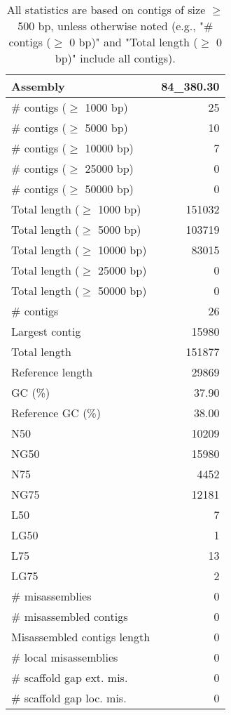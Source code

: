\documentclass[12pt,a4paper]{article}
\begin{document}
\begin{table}[ht]
\begin{center}
\caption{All statistics are based on contigs of size $\geq$ 500 bp, unless otherwise noted (e.g., "\# contigs ($\geq$ 0 bp)" and "Total length ($\geq$ 0 bp)" include all contigs).}
\begin{tabular}{|l*{1}{|r}|}
\hline
Assembly & 84\_380.30 \\ \hline
\# contigs ($\geq$ 1000 bp) & 25 \\ \hline
\# contigs ($\geq$ 5000 bp) & 10 \\ \hline
\# contigs ($\geq$ 10000 bp) & 7 \\ \hline
\# contigs ($\geq$ 25000 bp) & 0 \\ \hline
\# contigs ($\geq$ 50000 bp) & 0 \\ \hline
Total length ($\geq$ 1000 bp) & 151032 \\ \hline
Total length ($\geq$ 5000 bp) & 103719 \\ \hline
Total length ($\geq$ 10000 bp) & 83015 \\ \hline
Total length ($\geq$ 25000 bp) & 0 \\ \hline
Total length ($\geq$ 50000 bp) & 0 \\ \hline
\# contigs & 26 \\ \hline
Largest contig & 15980 \\ \hline
Total length & 151877 \\ \hline
Reference length & 29869 \\ \hline
GC (\%) & 37.90 \\ \hline
Reference GC (\%) & 38.00 \\ \hline
N50 & 10209 \\ \hline
NG50 & 15980 \\ \hline
N75 & 4452 \\ \hline
NG75 & 12181 \\ \hline
L50 & 7 \\ \hline
LG50 & 1 \\ \hline
L75 & 13 \\ \hline
LG75 & 2 \\ \hline
\# misassemblies & 0 \\ \hline
\# misassembled contigs & 0 \\ \hline
Misassembled contigs length & 0 \\ \hline
\# local misassemblies & 0 \\ \hline
\# scaffold gap ext. mis. & 0 \\ \hline
\# scaffold gap loc. mis. & 0 \\ \hline

\end{tabular}
\end{center}
\end{table}
\end{document}
